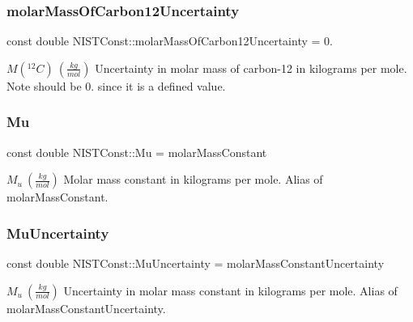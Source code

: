 \subsubsection{\texorpdfstring{molar\+Mass\+Of\+Carbon12\+Uncertainty}{molarMassOfCarbon12Uncertainty}}
{\footnotesize\ttfamily const double N\+I\+S\+T\+Const\+::molar\+Mass\+Of\+Carbon12\+Uncertainty = 0.}

$M({^{12}C}) \ (\frac{kg}{mol})$ Uncertainty in molar mass of carbon-\/12 in kilograms per mole. Note should be 0. since it is a defined value. \mbox{\label{group___molar_mass_constant_ga06104635bf45affb9e10a3f6581b4076}} 
\subsubsection{\texorpdfstring{Mu}{Mu}}
{\footnotesize\ttfamily const double N\+I\+S\+T\+Const\+::\+Mu = molar\+Mass\+Constant}

$M_u \ (\frac{kg}{mol})$ Molar mass constant in kilograms per mole. Alias of molar\+Mass\+Constant. \mbox{\label{group___molar_mass_constant_gacb7d27c9a39a3add815f0c8b97d5b425}} 
\subsubsection{\texorpdfstring{Mu\+Uncertainty}{MuUncertainty}}
{\footnotesize\ttfamily const double N\+I\+S\+T\+Const\+::\+Mu\+Uncertainty = molar\+Mass\+Constant\+Uncertainty}

$M_u \ (\frac{kg}{mol})$ Uncertainty in molar mass constant in kilograms per mole. Alias of molar\+Mass\+Constant\+Uncertainty. 